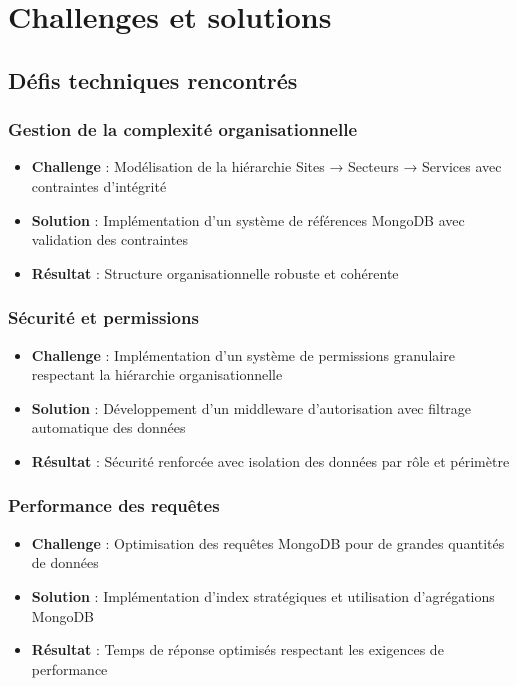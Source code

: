 \section{Challenges et solutions}
\subsection{Défis techniques rencontrés}
\subsubsection{Gestion de la complexité organisationnelle}
\begin{itemize}
    \item \textbf{Challenge} : Modélisation de la hiérarchie Sites → Secteurs → Services avec contraintes d'intégrité
    \item \textbf{Solution} : Implémentation d'un système de références MongoDB avec validation des contraintes
    \item \textbf{Résultat} : Structure organisationnelle robuste et cohérente
\end{itemize}

\subsubsection{Sécurité et permissions}
\begin{itemize}
    \item \textbf{Challenge} : Implémentation d'un système de permissions granulaire respectant la hiérarchie organisationnelle
    \item \textbf{Solution} : Développement d'un middleware d'autorisation avec filtrage automatique des données
    \item \textbf{Résultat} : Sécurité renforcée avec isolation des données par rôle et périmètre
\end{itemize}

\subsubsection{Performance des requêtes}
\begin{itemize}
    \item \textbf{Challenge} : Optimisation des requêtes MongoDB pour de grandes quantités de données
    \item \textbf{Solution} : Implémentation d'index stratégiques et utilisation d'agrégations MongoDB
    \item \textbf{Résultat} : Temps de réponse optimisés respectant les exigences de performance
\end{itemize}


